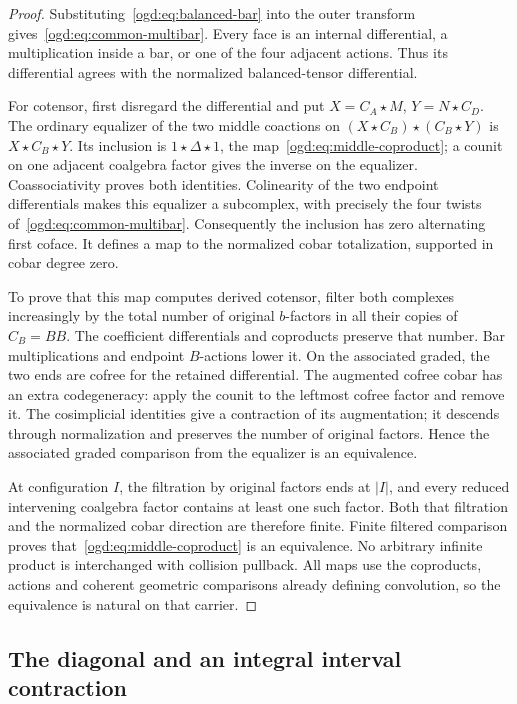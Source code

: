 \begin{proof}
Substituting~\eqref{ogd:eq:balanced-bar} into the outer transform gives~\eqref{ogd:eq:common-multibar}.
Every face is an internal differential, a multiplication inside a bar, or one of the four adjacent actions.
Thus its differential agrees with the normalized balanced-tensor differential.

For cotensor, first disregard the differential and put \(X=C_A\star M\), \(Y=N\star C_D\).
The ordinary equalizer of the two middle coactions on \((X\star C_B)\star(C_B\star Y)\) is \(X\star C_B\star Y\).
Its inclusion is \(1\star\Delta\star1\), the map~\eqref{ogd:eq:middle-coproduct}; a counit on one adjacent coalgebra factor gives the inverse on the equalizer.
Coassociativity proves both identities.
Colinearity of the two endpoint differentials makes this equalizer a subcomplex, with precisely the four twists of~\eqref{ogd:eq:common-multibar}.
Consequently the inclusion has zero alternating first coface.
It defines a map to the normalized cobar totalization, supported in cobar degree zero.

To prove that this map computes derived cotensor, filter both complexes increasingly by the total number of original \(b\)-factors in all their copies of \(C_B=BB\).
The coefficient differentials and coproducts preserve that number.
Bar multiplications and endpoint \(B\)-actions lower it.
On the associated graded, the two ends are cofree for the retained differential.
The augmented cofree cobar has an extra codegeneracy: apply the counit to the leftmost cofree factor and remove it.
The cosimplicial identities give a contraction of its augmentation; it descends through normalization and preserves the number of original factors.
Hence the associated graded comparison from the equalizer is an equivalence.

At configuration \(I\), the filtration by original factors ends at \(|I|\), and every reduced intervening coalgebra factor contains at least one such factor.
Both that filtration and the normalized cobar direction are therefore finite.
Finite filtered comparison proves that~\eqref{ogd:eq:middle-coproduct} is an equivalence.
No arbitrary infinite product is interchanged with collision pullback.
All maps use the coproducts, actions and coherent geometric comparisons already defining convolution, so the equivalence is natural on that carrier.
\end{proof}

\subsection{The diagonal and an integral interval contraction}

